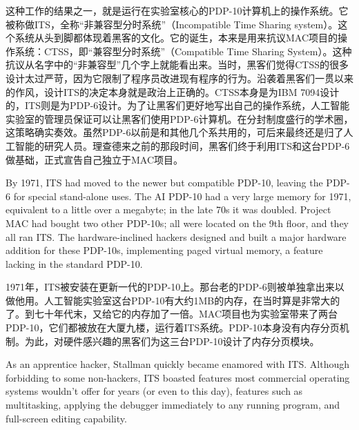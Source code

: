 \ifdefined\chs
这种工作的结果之一，就是运行在实验室核心的PDP-10计算机上的操作系统。它被称做ITS，全称“非兼容型分时系统”（Incompatible Time Sharing system）。这个系统从头到脚都体现着黑客的文化。它的诞生，本来是用来抗议MAC项目的操作系统：CTSS，即“兼容型分时系统”（Compatible Time Sharing System）。这种抗议从名字中的“非兼容型”几个字上就能看出来。当时，黑客们觉得CTSS的很多设计太过严苛，因为它限制了程序员改进现有程序的行为。沿袭着黑客们一贯以来的作风，设计ITS的决定本身就是政治上正确的。CTSS本身是为IBM 7094设计的，ITS则是为PDP-6设计。为了让黑客们更好地写出自己的操作系统，人工智能实验室的管理员保证可以让黑客们使用PDP-6计算机。在分封制度盛行的学术圈，这策略确实奏效。虽然PDP-6以前是和其他几个系共用的，可后来最终还是归了人工智能的研究人员。理查德来之前的那段时间，黑客们终于利用ITS和这台PDP-6做基础，正式宣告自己独立于MAC项目。
\fi

\ifdefined\eng
By 1971, ITS had moved to the newer but compatible PDP-10, leaving the PDP-6 for special stand-alone uses. The AI PDP-10 had a very large memory for 1971, equivalent to a little over a megabyte; in the late 70s it was doubled.   Project MAC had bought two other PDP-10s; all were located on the 9th floor, and they all ran ITS.  The hardware-inclined hackers designed and built a major hardware addition for these PDP-10s, implementing paged virtual memory, a feature lacking in the standard PDP-10.
\fi

\ifdefined\chs
1971年，ITS被安装在更新一代的PDP-10上。那台老的PDP-6则被单独拿出来以做他用。人工智能实验室这台PDP-10有大约1MB的内存，在当时算是非常大的了。到七十年代末，又给它的内存加了一倍。MAC项目也为实验室带来了两台PDP-10，它们都被放在大厦九楼，运行着ITS系统。PDP-10本身没有内存分页机制。为此，对硬件感兴趣的黑客们为这三台PDP-10设计了内存分页模块。
\fi

\ifdefined\eng
As an apprentice hacker, Stallman quickly became enamored with ITS. Although forbidding to some non-hackers, ITS boasted features most commercial operating systems wouldn't offer for years (or even to this day), features such as multitasking, applying the debugger immediately to any running program, and full-screen editing capability. 
\fi

